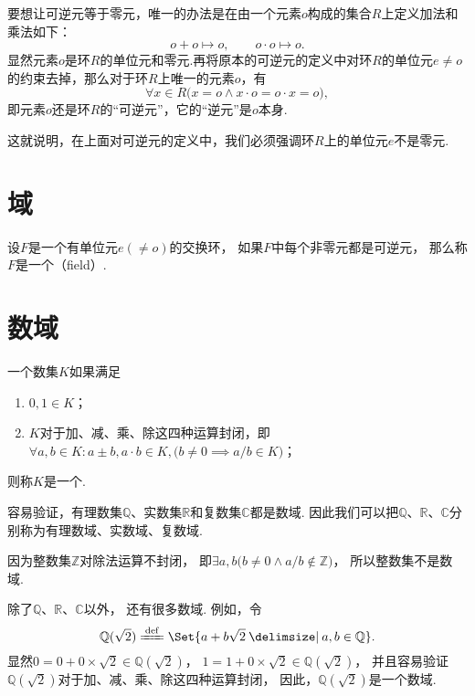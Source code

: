 \begin{example}
要想让可逆元等于零元，唯一的办法是在由一个元素\(o\)构成的集合\(R\)上定义加法和乘法如下：\[
o + o \mapsto o,
\qquad
o \cdot o \mapsto o.
\]显然元素\(o\)是环\(R\)的单位元和零元.再将原本的可逆元的定义中对环\(R\)的单位元\(e \neq o\)的约束去掉，那么对于环\(R\)上唯一的元素\(o\)，有\[
\forall x \in R \bigl( x = o \land x \cdot o = o \cdot x = o \bigr),
\]即元素\(o\)还是环\(R\)的“可逆元”，它的“逆元”是\(o\)本身.

这就说明，在上面对可逆元的定义中，我们必须强调环\(R\)上的单位元\(e\)不是零元.
\end{example}

\section{域}
\begin{definition}
设\(F\)是一个有单位元\(e(\neq o)\)的交换环，%
如果\(F\)中每个非零元都是可逆元，%
那么称\(F\)是一个（field）.
\end{definition}

\section{数域}
\begin{definition}
一个数集\(K\)如果满足\begin{enumerate}
\item \(0,1 \in K\)；
\item \(K\)对于加、减、乘、除这四种运算封闭，即%
\(\forall a,b \in K :
a \pm b,
a \cdot b \in K,
\bigl( b \neq 0 \implies a/b \in K \bigr)
\)；
\end{enumerate}
则称\(K\)是一个.
\end{definition}
容易验证，有理数集\(\mathbb{Q}\)、实数集\(\mathbb{R}\)和复数集\(\mathbb{C}\)都是数域.
因此我们可以把\(\mathbb{Q}\)、\(\mathbb{R}\)、\(\mathbb{C}\)分别称为有理数域、实数域、复数域.

因为整数集\(\mathbb{Z}\)对除法运算不封闭，%
即\(\exists a, b \bigl( b \neq 0 \land a/b \notin \mathbb{Z} \bigr)\)，%
所以整数集不是数域.

除了\(\mathbb{Q}\)、\(\mathbb{R}\)、\(\mathbb{C}\)以外，%
还有很多数域.
例如，令{\def\Q{\mathbb{Q}(\sqrt{2})}%
\[
\Q
\defeq
\Set{ a + b \sqrt{2} \given a,b \in \mathbb{Q} }.
\]
显然\(0=0+0\times\sqrt{2}\in\Q\)，%
\(1=1+0\times\sqrt{2}\in\Q\)，%
并且容易验证\(\Q\)对于加、减、乘、除这四种运算封闭，%
因此，\(\Q\)是一个数域.
}%

